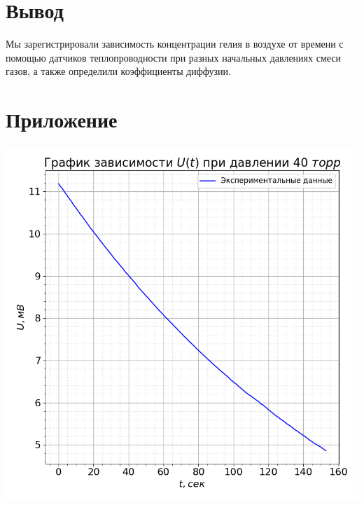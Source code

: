 \documentclass[a4paper, 12pt]{article}
\begin{document}
    \section{Вывод}

        Мы зарегистрировали зависимость концентрации гелия в воздухе от времени с помощью датчиков теплопроводности при разных начальных давлениях смеси газов, а также определили коэффициенты диффузии.

    \section{Приложение}

        \begin{minipage}{0.47\textwidth}
            \includegraphics[width=1\linewidth]{graphs/raw40.png}
        \end{minipage}
\end{document}
